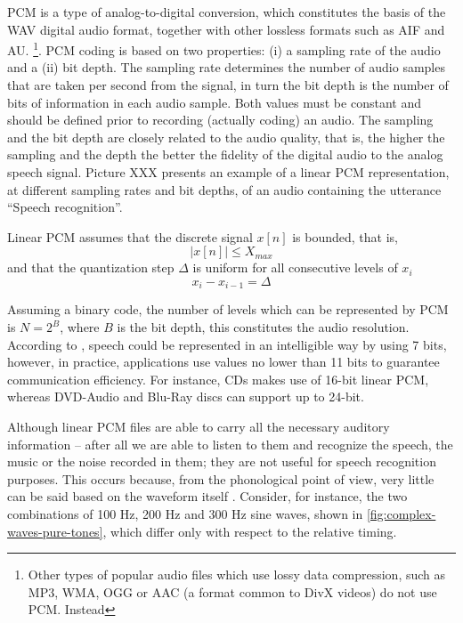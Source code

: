 \ac{PCM} is a type of analog-to-digital conversion, which constitutes the basis of the WAV digital audio format, together
with other lossless formats such as AIF and AU.
\footnote{Other types of popular audio files which use lossy data compression, such as MP3, WMA, OGG or AAC (a format common to 
DivX videos) do not use PCM. Instead}. 
PCM coding is based on two properties: (i) a sampling rate of the audio and a (ii) bit depth. The sampling rate determines the
number of audio samples that are taken per second from the signal, in turn the bit depth is the number of bits 
of information in each audio sample. Both values must be constant and should be defined prior to recording (actually coding) an audio. 
The sampling and the bit depth are closely related to the audio quality, that is, the higher the sampling and the depth
the better the fidelity of the digital audio to the analog speech signal. Picture XXX presents an example of a linear PCM 
representation, at different sampling rates and bit depths, of an audio containing the utterance ``Speech recognition''.

Linear PCM assumes that the discrete signal $x[n]$ is bounded, that is,
\begin{equation}
|x[n]| \leq X_{max} 
\end{equation}
and that the quantization step $\Delta$ is uniform for all consecutive levels of $x_i$
\begin{equation}
x_i - x_{i-1} = \Delta
\end{equation}

Assuming a binary code, the number of levels which can be represented by PCM is $N=2^B$, where $B$ is the bit depth, this constitutes
the audio resolution. According to \citep{Huang2001}, speech could be represented in an intelligible way by using 7 bits, however, in 
practice, applications use values no lower than 11 bits to guarantee communication efficiency. For instance, CDs makes use of 16-bit 
linear PCM, whereas DVD-Audio and Blu-Ray discs can support up to 24-bit.

Although linear PCM files are able to carry all the necessary auditory information -- after all we are able to listen to them and
recognize the speech, the music or the noise recorded in them; they are not useful for speech recognition purposes. This occurs 
because, from the phonological point of view, very little can be said based on the waveform itself \citep{Shrawankar2010}.
Consider, for instance, the two combinations of 100 Hz, 200 Hz and 300 Hz sine waves, shown in \autoref{fig:complex-waves-pure-tones}, 
which differ only with respect to the relative timing.


